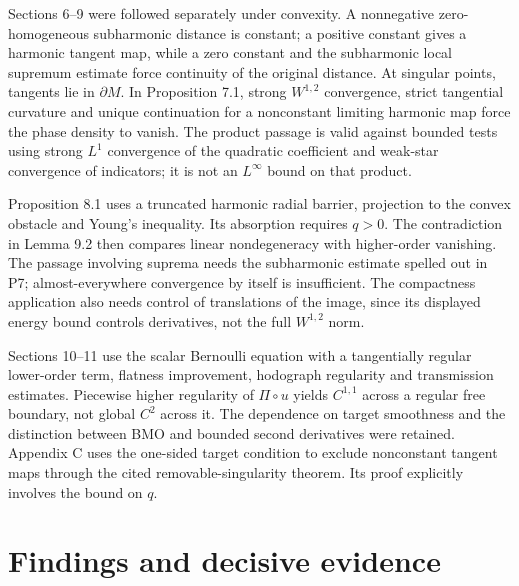 \documentclass[10pt]{article}
\begin{document}
Sections 6–9 were followed separately under convexity. A nonnegative zero-homogeneous subharmonic distance is constant; a positive constant gives a harmonic tangent map, while a zero constant and the subharmonic local supremum estimate force continuity of the original distance. At singular points, tangents lie in \(\partial M\). In Proposition 7.1, strong \(W^{1,2}\) convergence, strict tangential curvature and unique continuation for a nonconstant limiting harmonic map force the phase density to vanish. The product passage is valid against bounded tests using strong \(L^1\) convergence of the quadratic coefficient and weak-star convergence of indicators; it is not an \(L^\infty\) bound on that product.\par
Proposition 8.1 uses a truncated harmonic radial barrier, projection to the convex obstacle and Young’s inequality. Its absorption requires \(q>0\). The contradiction in Lemma 9.2 then compares linear nondegeneracy with higher-order vanishing. The passage involving suprema needs the subharmonic estimate spelled out in P7; almost-everywhere convergence by itself is insufficient. The compactness application also needs control of translations of the image, since its displayed energy bound controls derivatives, not the full \(W^{1,2}\) norm.\par
Sections 10–11 use the scalar Bernoulli equation with a tangentially regular lower-order term, flatness improvement, hodograph regularity and transmission estimates. Piecewise higher regularity of \(\Pi\circ u\) yields \(C^{1,1}\) across a regular free boundary, not global \(C^2\) across it. The dependence on target smoothness and the distinction between BMO and bounded second derivatives were retained. Appendix C uses the one-sided target condition to exclude nonconstant tangent maps through the cited removable-singularity theorem. Its proof explicitly involves the bound on \(q\).\par
\section*{Findings and decisive evidence}
\end{document}

